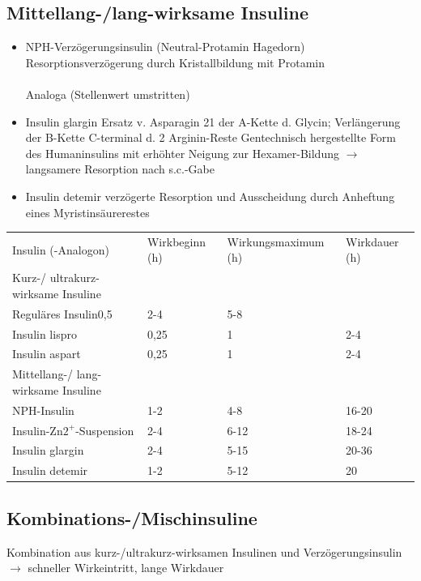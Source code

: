 \documentclass[10pt,a4paper]{report}
\begin{document}
\subsection{Mittellang-/lang-wirksame Insuline} %
\label{ssub:mittellang_lang_wirksame_insuline}
\begin{itemize}
	\item NPH-Verzögerungsinsulin (Neutral-Protamin Hagedorn) Resorptionsverzögerung durch Kristallbildung mit Protamin \\ \\
	Analoga (Stellenwert umstritten)
	\item Insulin glargin Ersatz v. Asparagin 21 der A-Kette d. Glycin; Verlängerung der B-Kette C-terminal d. 2 Arginin-Reste Gentechnisch hergestellte Form des Humaninsulins mit erhöhter Neigung zur Hexamer-Bildung $\rightarrow$ langsamere Resorption nach s.c.-Gabe
	\item Insulin detemir verzögerte Resorption und Ausscheidung durch Anheftung eines Myristinsäurerestes 
\end{itemize}
\begin{tabularx}{\textwidth}{XXXX}
Insulin (-Analogon)&Wirkbeginn (h)&Wirkungsmaximum (h)&Wirkdauer (h)\\
Kurz-/ ultrakurz-wirksame Insuline&&&\\
Reguläres Insulin0,5&2-4&5-8\\
Insulin lispro&0,25&1&2-4\\
Insulin aspart&0,25&1&2-4\\
Mittellang-/ lang-wirksame Insuline&&&\\
NPH-Insulin&1-2&4-8&16-20\\
Insulin-Zn$2^+$-Suspension&2-4&6-12&18-24\\
Insulin glargin&2-4&5-15&20-36\\
Insulin detemir&1-2&5-12&20\\
\end{tabularx}
\subsection{Kombinations-/Mischinsuline} %
\label{sub:kombinations_mischinsuline}
Kombination aus kurz-/ultrakurz-wirksamen Insulinen und Verzögerungsinsulin $\rightarrow$ schneller Wirkeintritt, lange Wirkdauer
\end{document}
